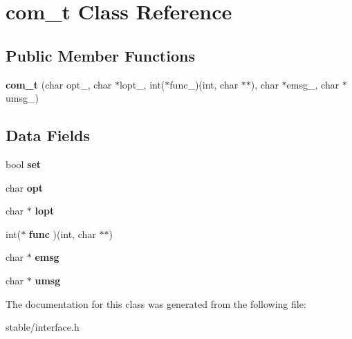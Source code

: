 \hypertarget{classcom__t}{\section{com\-\_\-t Class Reference}
\label{classcom__t}
}
\subsection*{Public Member Functions}
\begin{DoxyCompactItemize}
\item 
\hypertarget{classcom__t_ab94dc9902c7ffb72768825bb9dc5afda}{{\bfseries com\-\_\-t} (char opt\-\_\-, char $\ast$lopt\-\_\-, int($\ast$func\-\_\-)(int, char $\ast$$\ast$), char $\ast$emsg\-\_\-, char $\ast$umsg\-\_\-)}\label{classcom__t_ab94dc9902c7ffb72768825bb9dc5afda}

\end{DoxyCompactItemize}
\subsection*{Data Fields}
\begin{DoxyCompactItemize}
\item 
\hypertarget{classcom__t_ae8b6c03d7ec9397c7570295b9f0162fc}{bool {\bfseries set}}\label{classcom__t_ae8b6c03d7ec9397c7570295b9f0162fc}

\item 
\hypertarget{classcom__t_a221c5d1fb0f1d23299526c0efb7c131d}{char {\bfseries opt}}\label{classcom__t_a221c5d1fb0f1d23299526c0efb7c131d}

\item 
\hypertarget{classcom__t_a9fc395b3e6669f5370ff4c4281202a9e}{char $\ast$ {\bfseries lopt}}\label{classcom__t_a9fc395b3e6669f5370ff4c4281202a9e}

\item 
\hypertarget{classcom__t_a04457e8446cd906b5bed24c43077979d}{int($\ast$ {\bfseries func} )(int, char $\ast$$\ast$)}\label{classcom__t_a04457e8446cd906b5bed24c43077979d}

\item 
\hypertarget{classcom__t_a335660c29bfa0cf5e324a3d54704f351}{char $\ast$ {\bfseries emsg}}\label{classcom__t_a335660c29bfa0cf5e324a3d54704f351}

\item 
\hypertarget{classcom__t_a2c4d760c9849ab6c4fd24258ee9bd194}{char $\ast$ {\bfseries umsg}}\label{classcom__t_a2c4d760c9849ab6c4fd24258ee9bd194}

\end{DoxyCompactItemize}


The documentation for this class was generated from the following file\-:\begin{DoxyCompactItemize}
\item 
stable/interface.\-h\end{DoxyCompactItemize}
